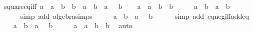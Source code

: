 \begin{isabellebody}
{\isafoldproof}%
%
\isadelimproof
\isanewline
%
\endisadelimproof
\isanewline
{}\isamarkupfalse%
\ square{\isacharunderscore}{\kern0pt}eq{\isacharunderscore}{\kern0pt}iff{\isacharcolon}{\kern0pt}\ {\isachardoublequoteopen}a\ {\isacharasterisk}{\kern0pt}\ a\ {\isacharequal}{\kern0pt}\ b\ {\isacharasterisk}{\kern0pt}\ b\ {\isasymlongleftrightarrow}\ a\ {\isacharequal}{\kern0pt}\ b\ {\isasymor}\ a\ {\isacharequal}{\kern0pt}\ {\isacharminus}{\kern0pt}\ b{\isachardoublequoteclose}\isanewline
%
\isadelimproof
%
\endisadelimproof
%
\isatagproof
{}\isamarkupfalse%
\isanewline
\ \ \isamarkupfalse%
\ {\isachardoublequoteopen}a\ {\isacharasterisk}{\kern0pt}\ a\ {\isacharequal}{\kern0pt}\ b\ {\isacharasterisk}{\kern0pt}\ b{\isachardoublequoteclose}\isanewline
\ \ \isamarkupfalse%
\ \isamarkupfalse%
\ {\isachardoublequoteopen}{\isacharparenleft}{\kern0pt}a\ {\isacharminus}{\kern0pt}\ b{\isacharparenright}{\kern0pt}\ {\isacharasterisk}{\kern0pt}\ {\isacharparenleft}{\kern0pt}a\ {\isacharplus}{\kern0pt}\ b{\isacharparenright}{\kern0pt}\ {\isacharequal}{\kern0pt}\ {}{\isachardoublequoteclose}\isanewline
\ \ \ \ \isamarkupfalse%
\ {\isacharparenleft}{\kern0pt}simp\ add{\isacharcolon}{\kern0pt}\ algebra{\isacharunderscore}{\kern0pt}simps{\isacharparenright}{\kern0pt}\isanewline
\ \ \isamarkupfalse%
\ \isamarkupfalse%
\ {\isachardoublequoteopen}a\ {\isacharequal}{\kern0pt}\ b\ {\isasymor}\ a\ {\isacharequal}{\kern0pt}\ {\isacharminus}{\kern0pt}\ b{\isachardoublequoteclose}\isanewline
\ \ \ \ \isamarkupfalse%
\ {\isacharparenleft}{\kern0pt}simp\ add{\isacharcolon}{\kern0pt}\ eq{\isacharunderscore}{\kern0pt}neg{\isacharunderscore}{\kern0pt}iff{\isacharunderscore}{\kern0pt}add{\isacharunderscore}{\kern0pt}eq{\isacharunderscore}{\kern0pt}{}{\isacharparenright}{\kern0pt}\isanewline
{}\isamarkupfalse%
\isanewline
\ \ \isamarkupfalse%
\ {\isachardoublequoteopen}a\ {\isacharequal}{\kern0pt}\ b\ {\isasymor}\ a\ {\isacharequal}{\kern0pt}\ {\isacharminus}{\kern0pt}\ b{\isachardoublequoteclose}\isanewline
\ \ \isamarkupfalse%
\ \isamarkupfalse%
\ {\isachardoublequoteopen}a\ {\isacharasterisk}{\kern0pt}\ a\ {\isacharequal}{\kern0pt}\ b\ {\isacharasterisk}{\kern0pt}\ b{\isachardoublequoteclose}\ \isamarkupfalse%
\ auto\isanewline
{}\isamarkupfalse%
%
\endisatagproof
{\isafoldproof}%
%
\isadelimproof
\isanewline
%
\endisadelimproof

\end{isabellebody}

